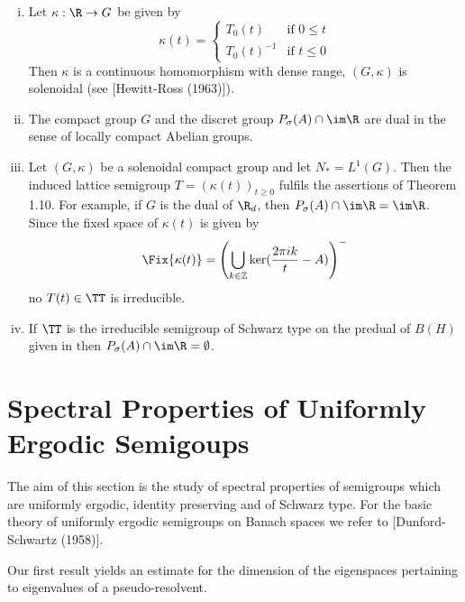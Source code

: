 \begin{remark}\label{rem:d3-1.14}
\begin{enumerate}[(i), wide]
\item Let $\kappa:\R \to G$ be given by
\[
\kappa(t) = \begin{cases}
T_{0}(t) & \text{if } 0 \leq t \\
T_{0}(t)^{-1} & \text{if } t \leq 0
\end{cases}
\]
Then $\kappa$ is a continuous homomorphism with dense range, \ie $(G,\kappa)$ is solenoidal (see [Hewitt-Ross (1963)]).

\item The compact group $G$ and the discret group $P_{\sigma}(A) \cap \im\R$ are dual in the sense of locally compact Abelian groups.

\item Let $(G,\kappa)$ be a solenoidal compact group and let $N_{*} = L^{1}(G)$.
Then the induced lattice semigroup $T = (\kappa(t))_{t \geq 0}$ fulfils the assertions of Theorem 1.10.
For example, if $G$ is the dual of $\R_{d}$, then $P_{\sigma}(A) \cap \im\R = \im\R$.
Since the fixed space of $\kappa(t)$ is given by
\[
	\Fix{\kappa(t)} = \left(\bigcup_{k \in \mathbb{Z}} \ker(\frac{2\pi ik}{t} - A)\right)^{-}
\]
no $T(t) \in \TT$ is irreducible.

\item If $\TT$ is the irreducible semigroup of Schwarz type on the predual of $B(H)$ given in \citet{evans:1977} then $P_{\sigma}(A) \cap \im\R = \emptyset$.
\end{enumerate}
\end{remark}

\section{Spectral Properties of Uniformly Ergodic Semigoups}\label{sec:d3-2}

The aim of this section is the study of spectral properties of semigroups which are uniformly ergodic, identity preserving and of Schwarz type.
For the basic theory of uniformly ergodic semigroups on Banach spaces we refer to [Dunford-Schwartz (1958)].






Our first result yields an estimate for the dimension of the eigenspaces pertaining to eigenvalues of a pseudo-resolvent.

